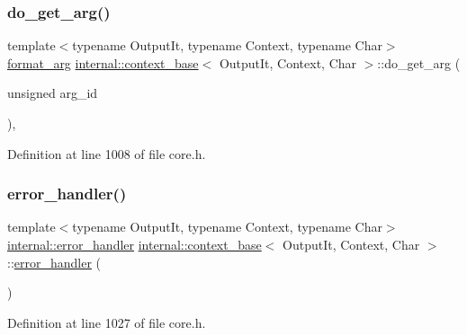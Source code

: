 \subsubsection{\texorpdfstring{do\+\_\+get\+\_\+arg()}{do\_get\_arg()}}
{\footnotesize\ttfamily template$<$typename Output\+It, typename Context, typename Char$>$ \\
\hyperlink{classinternal_1_1context__base_aa0c806d3176db7f4c5e5a0fa08561102}{format\+\_\+arg} \hyperlink{classinternal_1_1context__base}{internal\+::context\+\_\+base}$<$ Output\+It, Context, Char $>$\+::do\+\_\+get\+\_\+arg (\begin{DoxyParamCaption}\item[{unsigned}]{arg\+\_\+id }\end{DoxyParamCaption})\hspace{0.3cm}{\ttfamily [inline]}, {\ttfamily [protected]}}



Definition at line 1008 of file core.\+h.

\mbox{\label{classinternal_1_1context__base_a75d451a0b31787d6e482e7b8c8886f45}} 
\subsubsection{\texorpdfstring{error\+\_\+handler()}{error\_handler()}}
{\footnotesize\ttfamily template$<$typename Output\+It, typename Context, typename Char$>$ \\
\hyperlink{structinternal_1_1error__handler}{internal\+::error\+\_\+handler} \hyperlink{classinternal_1_1context__base}{internal\+::context\+\_\+base}$<$ Output\+It, Context, Char $>$\+::\hyperlink{structinternal_1_1error__handler}{error\+\_\+handler} (\begin{DoxyParamCaption}{ }\end{DoxyParamCaption})\hspace{0.3cm}{\ttfamily [inline]}}



Definition at line 1027 of file core.\+h.

\mbox{\label{classinternal_1_1context__base_acf1edcc7f389838d65ea8261d4c267e6}} 
